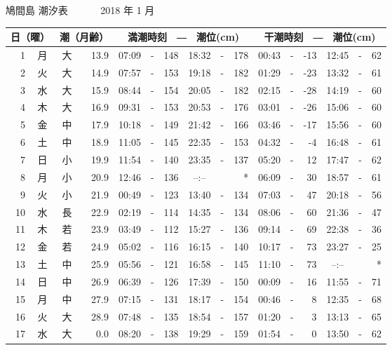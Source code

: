 \documentclass[12pt.a4j]{jsarticle}
\begin{document}
\pagestyle{empty}
\begin{center}
{\LARGE 鳩間島  潮汐表　　　}
{\large 2018 年  1 月}\\
\begin{table}[ht]
\begin{tabular}{|rc|cr|ccrccr|ccrccr|}
\hline
\multicolumn{2}{|c|}{日（曜）} & \multicolumn{2}{c|}{潮（月齢）} & \multicolumn{6}{c|}{満潮時刻　―　潮位(cm)} & \multicolumn{6}{c|}{干潮時刻　―　潮位(cm)} \\
\hline
 1 & 月 & 大 & 13.9 & 07:09 &-& 148 & 18:32 &-& 178 & 00:43 &-& -13 & 12:45 &-&  62 \\
 2 & 火 & 大 & 14.9 & 07:57 &-& 153 & 19:18 &-& 182 & 01:29 &-& -23 & 13:32 &-&  61 \\
 3 & 水 & 大 & 15.9 & 08:44 &-& 154 & 20:05 &-& 182 & 02:15 &-& -28 & 14:19 &-&  60 \\
 4 & 木 & 大 & 16.9 & 09:31 &-& 153 & 20:53 &-& 176 & 03:01 &-& -26 & 15:06 &-&  60 \\
 5 & 金 & 中 & 17.9 & 10:18 &-& 149 & 21:42 &-& 166 & 03:46 &-& -17 & 15:56 &-&  60 \\
 6 & 土 & 中 & 18.9 & 11:05 &-& 145 & 22:35 &-& 153 & 04:32 &-&  -4 & 16:48 &-&  61 \\
 7 & 日 & 小 & 19.9 & 11:54 &-& 140 & 23:35 &-& 137 & 05:20 &-&  12 & 17:47 &-&  62 \\
 8 & 月 & 小 & 20.9 & 12:46 &-& 136 & --:-- & &  *  & 06:09 &-&  30 & 18:57 &-&  61 \\
 9 & 火 & 小 & 21.9 & 00:49 &-& 123 & 13:40 &-& 134 & 07:03 &-&  47 & 20:18 &-&  56 \\
10 & 水 & 長 & 22.9 & 02:19 &-& 114 & 14:35 &-& 134 & 08:06 &-&  60 & 21:36 &-&  47 \\
11 & 木 & 若 & 23.9 & 03:49 &-& 112 & 15:27 &-& 136 & 09:14 &-&  69 & 22:38 &-&  36 \\
12 & 金 & 若 & 24.9 & 05:02 &-& 116 & 16:15 &-& 140 & 10:17 &-&  73 & 23:27 &-&  25 \\
13 & 土 & 中 & 25.9 & 05:56 &-& 121 & 16:58 &-& 145 & 11:10 &-&  73 & --:-- & &  *  \\
14 & 日 & 中 & 26.9 & 06:39 &-& 126 & 17:39 &-& 150 & 00:09 &-&  16 & 11:55 &-&  71 \\
15 & 月 & 中 & 27.9 & 07:15 &-& 131 & 18:17 &-& 154 & 00:46 &-&   8 & 12:35 &-&  68 \\
16 & 火 & 大 & 28.9 & 07:48 &-& 135 & 18:54 &-& 157 & 01:20 &-&   3 & 13:13 &-&  65 \\
17 & 水 & 大 &  0.0 & 08:20 &-& 138 & 19:29 &-& 159 & 01:54 &-&   0 & 13:50 &-&  62 \\

\end{tabular}
\end{table}
\end{center}
\end{document}
